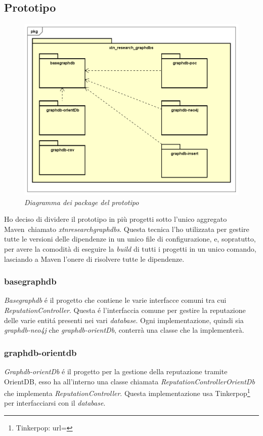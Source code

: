 \subsection{Prototipo}
\begin{figure}[h!]
	\centering
	\includegraphics[scale=0.4]{immagini/packages.png}
	\caption{\textit{Diagramma dei package del prototipo}}
\end{figure}
Ho deciso di dividere il prototipo in più progetti sotto l'unico aggregato Maven\glsfirstoccur\ chiamato \textit{xtn\textunderscore research\textunderscore graphdbs}. Questa tecnica l'ho utilizzata per gestire tutte le versioni delle dipendenze in un unico file di configurazione, e, sopratutto, per avere la comodità di eseguire la \textit{build} di tutti i progetti in un unico comando, lasciando a Maven l'onere di risolvere tutte le dipendenze.\\


\subsubsection{basegraphdb}
\textit{Basegraphdb} é il progetto che contiene le varie interfacce comuni tra cui \textit{ReputationController}. Questa é l'interfaccia comune per gestire la reputazione delle varie entitá presenti nei vari \textit{database}. Ogni implementazione, quindi sia \textit{graphdb-neo4j} che \textit{graphdb-orientDb}, conterrà una classe che la implementerà.
\subsubsection{graphdb-orientdb}
\textit{Graphdb-orientDb} é il progetto per la gestione della reputazione tramite OrientDB, esso ha all'interno una classe chiamata \textit{ReputationControllerOrientDb} che implementa \textit{ReputationController}. Questa implementazione usa Tinkerpop\footnote{Tinkerpop: url=} per interfacciarsi con il \textit{database}.
